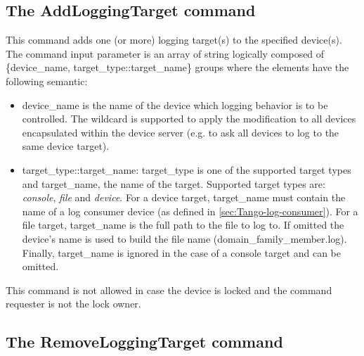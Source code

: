 \subsection{The AddLoggingTarget command}

This command adds one (or more) logging target(s) to the specified
device(s). The command input parameter is an array of string logically
composed of \{device\_name, target\_type::target\_name\} groups where
the elements have the following semantic: 
\begin{itemize}
\item device\_name is the name of the device which logging behavior is to
be controlled. The wildcard \textquotedbl{}{*}\textquotedbl{} is supported
to apply the modification to all devices encapsulated within the device
server (e.g. to ask all devices to log to the same device target).
\item target\_type::target\_name: target\_type is one of the supported target
types and target\_name, the name of the target. Supported target types
are: \emph{console}, \emph{file} and \emph{device}. For a device target,
target\_name must contain the name of a log consumer device (as defined
in \ref{sec:Tango-log-consumer}). For a file target, target\_name
is the full path to the file to log to. If omitted the device's name
is used to build the file name (domain\_family\_member.log). Finally,
target\_name is ignored in the case of a console target and can be
omitted.
\end{itemize}
This command is not allowed in case the device is locked and the command
requester is not the lock owner.


\subsection{The RemoveLoggingTarget command}

